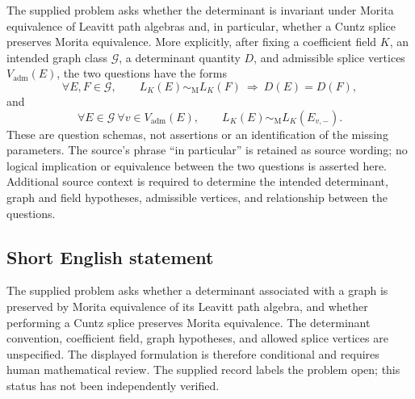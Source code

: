 \documentclass[11pt]{article}
\begin{document}
The supplied problem asks whether the determinant is invariant under Morita equivalence of Leavitt path algebras and, in particular, whether a Cuntz splice preserves Morita equivalence. More explicitly, after fixing a coefficient field \(K\), an intended graph class \(\mathcal G\), a determinant quantity \(D\), and admissible splice vertices \(V_{\mathrm{adm}}(E)\), the two questions have the forms
\[
 \forall E,F\in\mathcal G,\qquad
 L_K(E)\sim_{\mathrm M}L_K(F)
 \ \Longrightarrow\ D(E)=D(F),
\]
and
\[
 \forall E\in\mathcal G\ \forall v\in V_{\mathrm{adm}}(E),\qquad
 L_K(E)\sim_{\mathrm M}L_K(E_{v,-}).
\]
These are question schemas, not assertions or an identification of the missing parameters. The source's phrase ``in particular'' is retained as source wording; no logical implication or equivalence between the two questions is asserted here. Additional source context is required to determine the intended determinant, graph and field hypotheses, admissible vertices, and relationship between the questions.
\subsection{Short English statement}
The supplied problem asks whether a determinant associated with a graph is preserved by Morita equivalence of its Leavitt path algebra, and whether performing a Cuntz splice preserves Morita equivalence. The determinant convention, coefficient field, graph hypotheses, and allowed splice vertices are unspecified. The displayed formulation is therefore conditional and requires human mathematical review. The supplied record labels the problem open; this status has not been independently verified.
\end{document}
